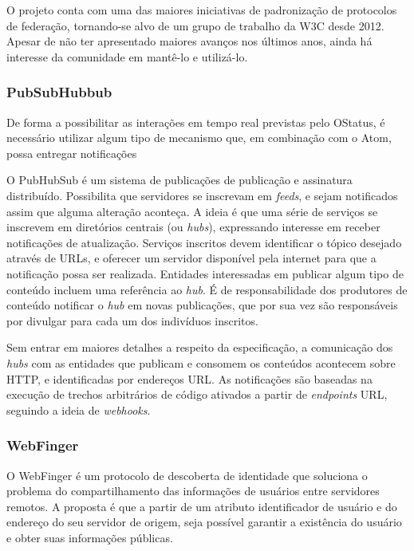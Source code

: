 O projeto conta com uma das maiores iniciativas de padronização de protocolos de
federação, tornando-se alvo de um grupo de trabalho da W3C desde 2012. Apesar de não
ter apresentado maiores avanços nos últimos anos, ainda há interesse da comunidade em
mantê-lo e utilizá-lo. 

\subsubsection{PubSubHubbub}

De forma a possibilitar as interações em tempo real previstas pelo  OStatus, é
necessário utilizar algum tipo de mecanismo que, em combinação com o Atom, possa
entregar notificações 

O PubHubSub é um sistema de publicações de publicação e assinatura distribuído.
Possibilita que servidores se inscrevam em \textit{feeds}, e sejam notificados assim
que alguma alteração aconteça. A ideia é que uma série de serviços se inscrevem em
diretórios centrais (ou \textit{hubs}), expressando interesse em receber notificações
de atualização. Serviços inscritos devem identificar o tópico desejado através de
URLs, e oferecer um servidor disponível pela internet para que a notificação possa
ser realizada. Entidades interessadas em publicar algum tipo de conteúdo incluem uma
referência ao \textit{hub}. É de responsabilidade dos produtores de conteúdo
notificar o \textit{hub} em novas publicações, que por sua vez são responsáveis por
divulgar para cada um dos indivíduos inscritos.

Sem entrar em maiores detalhes a respeito da especificação, a comunicação dos
\textit{hubs} com as entidades que publicam e consomem os conteúdos acontecem sobre
HTTP, e identificadas por endereços URL. As notificações são baseadas na execução de
trechos arbitrários de código ativados a partir de \textit{endpoints} URL, seguindo a
ideia de \textit{webhooks}.

\subsubsection{WebFinger}


O WebFinger é um protocolo de descoberta de identidade que soluciona o problema do
compartilhamento das informações de usuários entre servidores remotos. A proposta é
que a partir de um atributo identificador de usuário e do endereço do seu servidor de
origem, seja possível garantir a existência do usuário e obter suas informações
públicas.

